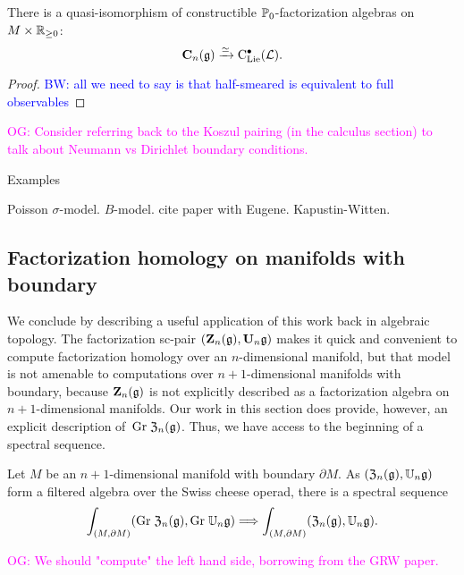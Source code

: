 \documentclass[11pt]{amsart}
\numberwithin{equation}{section}
\def\brian{\textcolor{blue}{BW: }\textcolor{blue}}
\def\owen{\textcolor{magenta}{OG: }\textcolor{magenta}}
\begin{document}
\begin{prp}
There is a quasi-isomorphism of constructible $\mathbb P_0$-factorization algebras on $M \times \mathbb R_{\geq 0}$:
\[
\mathbf C_n (\mathfrak g) \xrightarrow{\simeq} {\rm C}_{\rm Lie}^\bullet(\mathcal L) .
\]
\end{prp}

\begin{proof}
\brian{all we need to say is that half-smeared is equivalent to full observables}

\end{proof}

\owen{Consider referring back to the Koszul pairing (in the calculus section) to talk about Neumann vs Dirichlet boundary conditions.}


\begin{rmk} Examples

Poisson $\sigma$-model. 
$B$-model. 
cite paper with Eugene.
Kapustin-Witten. 
\end{rmk}

\subsection{Factorization homology on manifolds with boundary}

We conclude by describing a useful application of this work back in algebraic topology.
The factorization sc-pair $(\mathbf Z_n(\mathfrak g), \mathbf U_n \mathfrak g)$ makes it quick and convenient to compute factorization homology over an $n$-dimensional manifold,
but that model is not amenable to computations over $n+1$-dimensional manifolds with boundary,
because $\mathbf Z_n(\mathfrak g)$ is not explicitly described as a factorization algebra on $n+1$-dimensional manifolds.
Our work in this section does provide, however, an explicit description of~${\rm Gr}\; {\frak Z}_n(\mathfrak g)$. 
Thus, we have access to the beginning of a spectral sequence.

\begin{prp}
Let $M$ be an $n+1$-dimensional manifold with boundary $\partial M$. 
As $(\frak{Z}_n(\mathfrak g), \mathbb U_n \mathfrak g)$ form a filtered algebra over the Swiss cheese operad, 
there is a spectral sequence
\[
\int_{(M,\partial M)} ({\rm Gr}\; \frak{Z}_n(\mathfrak g), {\rm Gr}\; \mathbb U_n \mathfrak g) \Longrightarrow \int_{(M,\partial M)} (\frak{Z}_n(\mathfrak g), \mathbb U_n \mathfrak g).
\]
\end{prp}

\owen{We should "compute" the left hand side, borrowing from the GRW paper.}

  


%  
\end{document}
